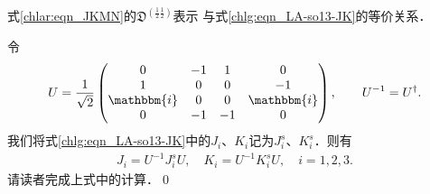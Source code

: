 \begin{example}
	式\eqref{chlar:eqn_JKMN}的$\mathfrak{D}^{(\frac{1}{2}\frac{1}{2})}$表示
	与式\eqref{chlg:eqn_LA-so13-JK}的等价关系．
\end{example}
令
\begin{align} 
	U=\frac{1}{\sqrt{2}}
		\begin{pmatrix}
			0 & -1 & 1 & 0 \\
			1 & 0 & 0 & -1 \\
			\mathbbm{i} & 0 & 0 & \mathbbm{i} \\
			0 & -1 & -1 & 0 
		\end{pmatrix},\qquad
    U^{-1} = U^\dagger .
\end{align}
我们将式\eqref{chlg:eqn_LA-so13-JK}中的$J_i$、$K_i$记为$J_i^s$、$K_i^s$．则有
\begin{align}
	J_i = U^{-1} J_i^s U, \quad K_i = U^{-1} K_i^s U,  \quad i = 1,2,3.
\end{align}
请读者完成上式中的计算．\qed

